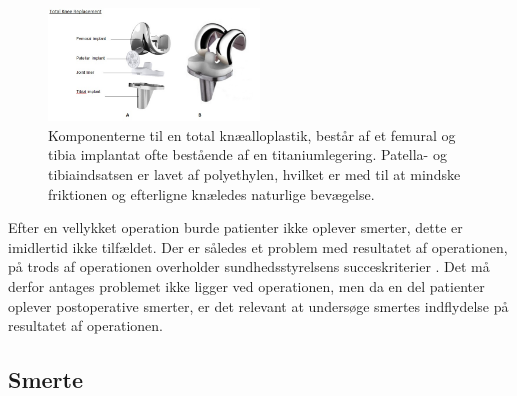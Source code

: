 \begin{figure}[H] 
	\begin{center}
		\includegraphics[width=0.5\textwidth]{../figures/tka_implant}
	\end{center}
	\caption{Komponenterne til en total knæalloplastik, består af et femural og tibia implantat ofte bestående af en titaniumlegering. Patella- og tibiaindsatsen er lavet af polyethylen, hvilket er med til at mindske friktionen og efterligne knæledes naturlige bevægelse.\citep{1}} 
	\label{fig:tka_implant} 
\end{figure}

Efter en vellykket operation burde patienter ikke oplever smerter, dette er imidlertid ikke tilfældet. Der er således et problem med resultatet af operationen, på trods af operationen overholder sundhedsstyrelsens succeskriterier \citep{aarsrapport2016}. Det må derfor antages problemet ikke ligger ved operationen, men da en del patienter oplever postoperative smerter, er det relevant at undersøge smertes indflydelse på resultatet af operationen. 

\subsection{Smerte}

